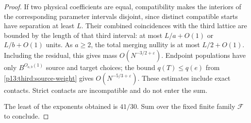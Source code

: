 \begin{proof}
If two physical coefficients are equal, compatibility makes the
interiors of the corresponding parameter intervals disjoint, since
distinct compatible starts have separation at least $L$.
Their combined coincidences with the third lattice are bounded by the
length of that third interval: at most $L/a+O(1)$ or $L/b+O(1)$ units.
As $a\geq2$, the total merging nullity is at most $L/2+O(1)$.
Including the residual, this gives mass $O(N^{-3/2+\varepsilon})$.
Endpoint populations have only $B^{O_{a,b}(1)}$ source and target
choices; the bound $q(T)\leq q(e)$ from
\eqref{p13:third:source-weight} gives $O(N^{-5/3+\varepsilon})$.
These estimates include exact contacts.  Strict contacts are incompatible
and do not enter the sum.

The least of the exponents obtained is $41/30$.  Sum over the fixed
finite family $\mathcal F$ to conclude.
\end{proof}
